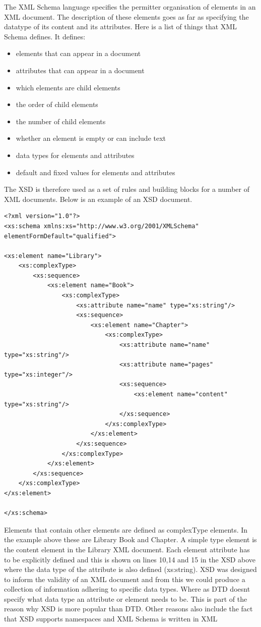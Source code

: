 \documentclass{report}
\begin{document}
The XML Schema language specifies the permitter organisation of elements in an XML document. The description of these elements goes as far as specifying the datatype of its content and its attributes. Here is a list of things that XML Schema defines.
\newline It defines:
\begin{multicols}{2}
\begin{itemize}
	\item elements that can appear in a document
	\item attributes that can appear in a document
	\item which elements are child elements
	\item the order of child elements
	\item the number of child elements
	\item whether an element is empty or can include text
	\item data types for elements and attributes
	\item default and fixed values for elements and attributes
\end{itemize} 
\end{multicols}
The XSD is therefore used as a set of rules and building blocks for a number of XML documents. Below is an example of an XSD document.
		
\begin{lstlisting}[caption=XML Library Schema,frame=tlrb]
<?xml version="1.0"?>
<xs:schema xmlns:xs="http://www.w3.org/2001/XMLSchema"
elementFormDefault="qualified">

<xs:element name="Library">
	<xs:complexType>
		<xs:sequence>
			<xs:element name="Book">
				<xs:complexType>
					<xs:attribute name="name" type="xs:string"/>
					<xs:sequence>
						<xs:element name="Chapter">
							<xs:complexType>
								<xs:attribute name="name" type="xs:string"/>
								<xs:attribute name="pages" type="xs:integer"/>
								<xs:sequence>
									<xs:element name="content" type="xs:string"/>
								</xs:sequence>
							</xs:complexType>
						</xs:element>
					</xs:sequence>
				</xs:complexType>
			</xs:element>
		</xs:sequence>
	</xs:complexType>
</xs:element>

</xs:schema>
\end{lstlisting}
Elements that contain other elements are defined as complexType elements. In the example above these are Library Book and Chapter. A simple type element is the content element in the Library XML document. Each element attribute has to be explicitly defined and this is shown on lines 10,14 and 15 in the XSD above where the data type of the attribute is also defined (xs:string).
XSD was designed to inform the validity of an XML document and from this we could produce a collection of information adhering to specific data types. Where as DTD doesnt specify what data type an attribute or element needs to be. This is part of the reason why XSD is more popular than DTD. Other reasons also include the fact that XSD supports namespaces and XML Schema is written in XML 
\end{document}
